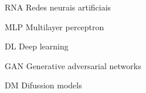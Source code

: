 \listoffigures*
\cleardoublepage


\listofquadros*
\cleardoublepage


\listoftables*
\cleardoublepage

%
%
\begin{siglas}
  \item[RNA] Redes neurais artificiais
  \item[MLP] Multilayer perceptron
  \item[DL] Deep learning
  \item[GAN] Generative adversarial networks
  \item[DM] Difussion models
\end{siglas}

%
% 

\tableofcontents*
\cleardoublepage
